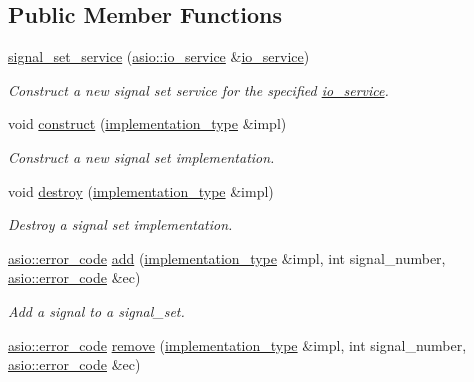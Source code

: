 \subsection*{Public Member Functions}
\begin{DoxyCompactItemize}
\item 
\hyperlink{classasio_1_1signal__set__service_a92b11f19a04b08d19a37117d2563896d}{signal\+\_\+set\+\_\+service} (\hyperlink{classasio_1_1io__service}{asio\+::io\+\_\+service} \&\hyperlink{classasio_1_1io__service}{io\+\_\+service})
\begin{DoxyCompactList}\small\item\em Construct a new signal set service for the specified \hyperlink{classasio_1_1io__service}{io\+\_\+service}. \end{DoxyCompactList}\item 
void \hyperlink{classasio_1_1signal__set__service_a146d77ee42e6f90c9439d4b80c038dc9}{construct} (\hyperlink{classasio_1_1signal__set__service_a15c9b1c4bf96f3491eb2e8e30b5a483a}{implementation\+\_\+type} \&impl)
\begin{DoxyCompactList}\small\item\em Construct a new signal set implementation. \end{DoxyCompactList}\item 
void \hyperlink{classasio_1_1signal__set__service_af6d5b3d632dbdd0a60fa89ea11577c92}{destroy} (\hyperlink{classasio_1_1signal__set__service_a15c9b1c4bf96f3491eb2e8e30b5a483a}{implementation\+\_\+type} \&impl)
\begin{DoxyCompactList}\small\item\em Destroy a signal set implementation. \end{DoxyCompactList}\item 
\hyperlink{classasio_1_1error__code}{asio\+::error\+\_\+code} \hyperlink{classasio_1_1signal__set__service_ab69c4ce4a544f28a7e8fdd178eb26ee3}{add} (\hyperlink{classasio_1_1signal__set__service_a15c9b1c4bf96f3491eb2e8e30b5a483a}{implementation\+\_\+type} \&impl, int signal\+\_\+number, \hyperlink{classasio_1_1error__code}{asio\+::error\+\_\+code} \&ec)
\begin{DoxyCompactList}\small\item\em Add a signal to a signal\+\_\+set. \end{DoxyCompactList}\item 
\hyperlink{classasio_1_1error__code}{asio\+::error\+\_\+code} \hyperlink{classasio_1_1signal__set__service_adff96c06d05cae9b88216706b1f05567}{remove} (\hyperlink{classasio_1_1signal__set__service_a15c9b1c4bf96f3491eb2e8e30b5a483a}{implementation\+\_\+type} \&impl, int signal\+\_\+number, \hyperlink{classasio_1_1error__code}{asio\+::error\+\_\+code} \&ec)

\end{DoxyCompactItemize}
